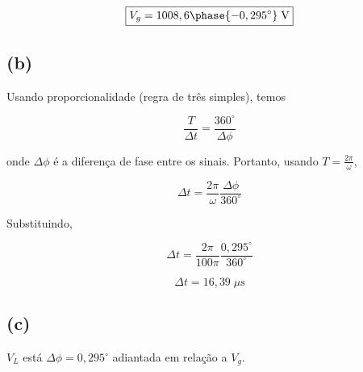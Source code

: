 \[ \boxed{V_g = 1008,6 \phase{-0,295^{\circ}}  \;\textrm{V}} \]

\subsection*{(b)}

Usando proporcionalidade (regra de três simples), temos   

\[ \frac{T}{\Delta t} = \frac{360^{\circ}}{\Delta \phi}  \]

onde $\Delta \phi$ é a diferença de fase entre os sinais. Portanto, usando $T = \frac{2\pi}{\omega}$,

\[ \Delta t = \frac{2\pi}{\omega} \frac{\Delta \phi}{360^{\circ}} \]

Substituindo,

\[ \Delta t = \frac{2\pi}{100\pi} \frac{0,295^{\circ}}{360^{\circ}} \]

\[ \boxed{\Delta t = 16,39 \;\mu\textrm{s}} \]

\subsection*{(c)}

$V_L$ está $\Delta \phi = 0,295^{\circ}$ adiantada em relação a $V_g$.










